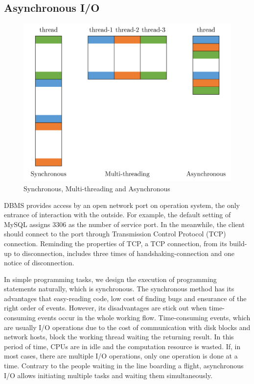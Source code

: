 \documentclass[onecolumn, conference, 12pt]{IEEEtran}
\begin{document}
	\subsection{Asynchronous I/O}
	\begin{figure}[!t]
	\centering
	\includegraphics[width=4.5in]{fig/sma.png}
	\caption{Synchronous, Multi-threading and Asynchronous}
	\label{fig_sma}
	\end{figure}
	DBMS provides access by an open network port on operation system, the only entrance of interaction with the outside. For example, the default setting of MySQL assigns $3306$ as the number of service port. In the meanwhile, the client should connect to the port through Transmission Control Protocol (TCP) connection. Reminding the properties of TCP, a TCP connection, from its build-up to disconnection, includes three times of handshaking-connection and one notice of disconnection. 

	In simple programming tasks, we design the execution of programming statements naturally, which is synchronous. The synchronous method has its advantages that easy-reading code, low cost of finding bugs and ensurance of the right order of events. However, its disadvantages are stick out when time-consuming events occur in the whole working flow. Time-consuming events, which are usually I/O operations due to the cost of communication with disk blocks and network hosts, block the working thread waiting the returning result. In this period of time, CPUs are in idle and the computation resource is wasted. If, in most cases, there are multiple I/O operations, only one operation is done at a time. Contrary to the people waiting in the line boarding a flight, asynchronous I/O allows initiating multiple tasks and waiting them simultaneously.
\end{document}
